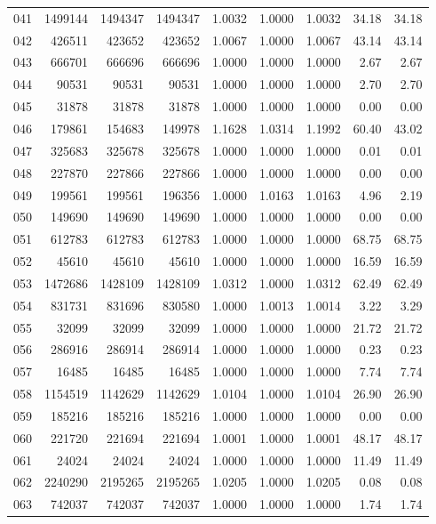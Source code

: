 \begin{longtable}{crrrrrrrr}
041 & 1499144 & 1494347 & 1494347 & 1.0032 & 1.0000 & 1.0032 & 34.18 & 34.18 \\
042 & 426511 & 423652 & 423652 & 1.0067 & 1.0000 & 1.0067 & 43.14 & 43.14 \\
043 & 666701 & 666696 & 666696 & 1.0000 & 1.0000 & 1.0000 & 2.67 & 2.67 \\
044 & 90531 & 90531 & 90531 & 1.0000 & 1.0000 & 1.0000 & 2.70 & 2.70 \\
045 & 31878 & 31878 & 31878 & 1.0000 & 1.0000 & 1.0000 & 0.00 & 0.00 \\
046 & 179861 & 154683 & 149978 & 1.1628 & 1.0314 & 1.1992 & 60.40 & 43.02 \\
047 & 325683 & 325678 & 325678 & 1.0000 & 1.0000 & 1.0000 & 0.01 & 0.01 \\
048 & 227870 & 227866 & 227866 & 1.0000 & 1.0000 & 1.0000 & 0.00 & 0.00 \\
049 & 199561 & 199561 & 196356 & 1.0000 & 1.0163 & 1.0163 & 4.96 & 2.19 \\
050 & 149690 & 149690 & 149690 & 1.0000 & 1.0000 & 1.0000 & 0.00 & 0.00 \\
051 & 612783 & 612783 & 612783 & 1.0000 & 1.0000 & 1.0000 & 68.75 & 68.75 \\
052 & 45610 & 45610 & 45610 & 1.0000 & 1.0000 & 1.0000 & 16.59 & 16.59 \\
053 & 1472686 & 1428109 & 1428109 & 1.0312 & 1.0000 & 1.0312 & 62.49 & 62.49 \\
054 & 831731 & 831696 & 830580 & 1.0000 & 1.0013 & 1.0014 & 3.22 & 3.29 \\
055 & 32099 & 32099 & 32099 & 1.0000 & 1.0000 & 1.0000 & 21.72 & 21.72 \\
056 & 286916 & 286914 & 286914 & 1.0000 & 1.0000 & 1.0000 & 0.23 & 0.23 \\
057 & 16485 & 16485 & 16485 & 1.0000 & 1.0000 & 1.0000 & 7.74 & 7.74 \\
058 & 1154519 & 1142629 & 1142629 & 1.0104 & 1.0000 & 1.0104 & 26.90 & 26.90 \\
059 & 185216 & 185216 & 185216 & 1.0000 & 1.0000 & 1.0000 & 0.00 & 0.00 \\
060 & 221720 & 221694 & 221694 & 1.0001 & 1.0000 & 1.0001 & 48.17 & 48.17 \\
061 & 24024 & 24024 & 24024 & 1.0000 & 1.0000 & 1.0000 & 11.49 & 11.49 \\
062 & 2240290 & 2195265 & 2195265 & 1.0205 & 1.0000 & 1.0205 & 0.08 & 0.08 \\
063 & 742037 & 742037 & 742037 & 1.0000 & 1.0000 & 1.0000 & 1.74 & 1.74 \\

\end{longtable}
